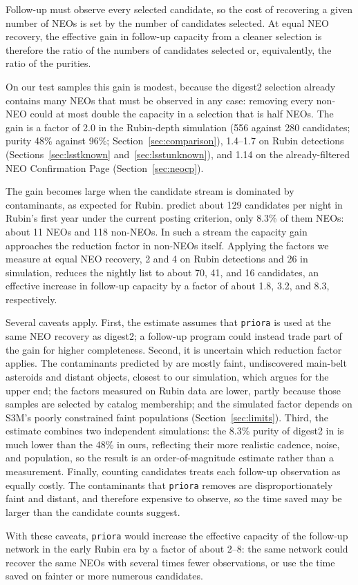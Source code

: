 \documentclass[linenumbers,twocolumn]{aastex701}
\newcommand{\priora}{{\tt priora}\xspace} %
\newenvironment{coauthorq}{\color{blue}}{}
\begin{document}
\begin{coauthorq}
Follow-up must observe every selected candidate, so the cost of recovering
a given number of NEOs is set by the number of candidates selected. At
equal NEO recovery, the effective gain in follow-up capacity from a cleaner
selection is therefore the ratio of the numbers of candidates selected or,
equivalently, the ratio of the purities.

On our test samples this gain is modest, because the digest2 selection
already contains many NEOs that must be observed in any case: removing every
non-NEO could at most double the capacity in a selection that is half NEOs.
The gain is a factor of 2.0 in the Rubin-depth simulation (556 against 280
candidates; purity 48\% against 96\%; Section~\ref{sec:comparison}), 1.4--1.7
on Rubin detections (Sections~\ref{sec:lsstknown}
and~\ref{sec:lsstunknown}), and 1.14 on the already-filtered NEO
Confirmation Page (Section~\ref{sec:neocp}).

The gain becomes large when the candidate stream is dominated by
contaminants, as expected for Rubin. \citet{wagg2025} predict about 129
candidates per night in Rubin's first year under the current posting
criterion, only 8.3\% of them NEOs: about 11 NEOs and 118 non-NEOs. In such
a stream the capacity gain approaches the reduction factor in non-NEOs
itself. Applying the factors we measure at equal NEO recovery, 2 and 4 on
Rubin detections and 26 in simulation, reduces the nightly list to about 70,
41, and 16 candidates, an effective increase in follow-up capacity by a
factor of about 1.8, 3.2, and 8.3, respectively.

Several caveats apply. First, the estimate assumes that \priora is used at
the same NEO recovery as digest2; a follow-up program could instead trade
part of the gain for higher completeness. Second, it is uncertain which
reduction factor applies. The contaminants predicted by \citet{wagg2025} are
mostly faint, undiscovered main-belt asteroids and distant objects, closest
to our simulation, which argues for the upper end; the factors measured on
Rubin data are lower, partly because those samples are selected by
catalog membership; and the simulated factor depends on S3M's poorly
constrained faint populations (Section~\ref{sec:limits}). Third, the
estimate combines two independent simulations: the 8.3\% purity of digest2
in \citet{wagg2025} is much lower than the 48\% in ours, reflecting their
more realistic cadence, noise, and population, so the result is an
order-of-magnitude estimate rather than a measurement. Finally, counting
candidates treats each follow-up observation as equally costly. The
contaminants that \priora removes are disproportionately faint and distant,
and therefore expensive to observe, so the time saved may be larger than
the candidate counts suggest.

With these caveats, \priora would increase the effective capacity of the
follow-up network in the early Rubin era by a factor of about 2--8: the same
network could recover the same NEOs with several times fewer observations,
or use the time saved on fainter or more numerous candidates.
\end{coauthorq}
\end{document}
